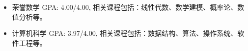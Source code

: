 
\begin{itemize}[nosep]
  \item 荣誉数学 GPA: 4.00/4.00, 相关课程包括：线性代数、数学建模、概率论、数值分析等。
  \item 计算机科学 GPA: 3.97/4.00, 相关课程包括：数据结构、算法、操作系统、软件工程等。
\end{itemize}
